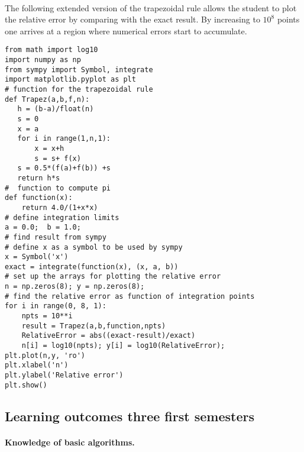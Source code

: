 \documentclass[%
twoside,                 %
final,                   %
10pt]{article}
\begin{document}
\paragraph{}
The following extended version of the trapezoidal rule allows the student to plot the relative error by comparing with the exact result. By increasing to $10^8$ points one arrives at a region where numerical errors start to accumulate.
\begin{verbatim}
from math import log10
import numpy as np
from sympy import Symbol, integrate
import matplotlib.pyplot as plt
# function for the trapezoidal rule
def Trapez(a,b,f,n):
   h = (b-a)/float(n)
   s = 0
   x = a
   for i in range(1,n,1):
       x = x+h
       s = s+ f(x)
   s = 0.5*(f(a)+f(b)) +s
   return h*s
#  function to compute pi
def function(x):
    return 4.0/(1+x*x)
# define integration limits
a = 0.0;  b = 1.0;
# find result from sympy
# define x as a symbol to be used by sympy
x = Symbol('x')
exact = integrate(function(x), (x, a, b))
# set up the arrays for plotting the relative error
n = np.zeros(8); y = np.zeros(8);
# find the relative error as function of integration points
for i in range(0, 8, 1):
    npts = 10**i
    result = Trapez(a,b,function,npts)
    RelativeError = abs((exact-result)/exact)
    n[i] = log10(npts); y[i] = log10(RelativeError);   
plt.plot(n,y, 'ro')
plt.xlabel('n')
plt.ylabel('Relative error')
plt.show()
\end{verbatim}





\subsection*{Learning outcomes three first semesters}

\paragraph{Knowledge of basic algorithms.}
\end{document}
